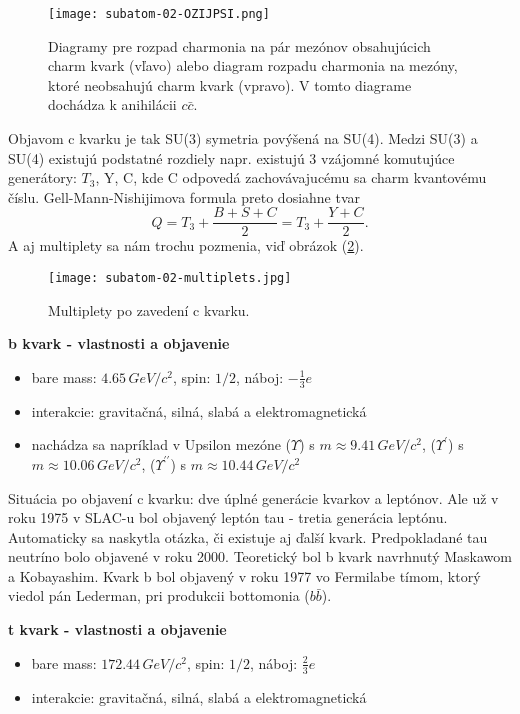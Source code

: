 \documentclass[../../main.tex]{subfiles}
\begin{document}
\begin{figure}[!h]
\texttt{[image: subatom-02-OZIJPSI.png]}
\centering
\caption{Diagramy pre rozpad charmonia na pár mezónov obsahujúcich charm kvark (vľavo) alebo diagram rozpadu charmonia na mezóny, ktoré neobsahujú charm kvark (vpravo). V tomto diagrame dochádza k anihilácii $c \bar{c}$.}
\label{sf2:fig:OZIJPSI}
\end{figure}

Objavom c kvarku je tak SU(3) symetria povýšená na SU(4). Medzi SU(3) a SU(4) existujú podstatné rozdiely napr. existujú 3 vzájomné komutujúce generátory: $T_3$, Y, C, kde C odpovedá zachovávajucému sa charm kvantovému číslu. Gell-Mann-Nishijimova formula preto dosiahne tvar 
$$ Q = T_3 + \frac{B+S+C}{2} = T_3 + \frac{Y+C}{2}.$$
A aj multiplety sa nám trochu pozmenia, viď obrázok (\ref{sf2:fig:multiplets}).

\begin{figure}[!h]
\texttt{[image: subatom-02-multiplets.jpg]}
\centering
\caption{Multiplety po zavedení c kvarku.}
\label{sf2:fig:multiplets}
\end{figure}


\textbf{b kvark - vlastnosti a objavenie}
\begin{itemize}
\item bare mass: $4.65\,\unit{GeV}/c^2$, spin: $1/2$, náboj: $-\frac{1}{3}e$ 
\item interakcie: gravitačná, silná, slabá a elektromagnetická
\item nachádza sa napríklad v Upsilon mezóne ($\Upsilon$) s $m \approx 9.41\,\unit{GeV}/c^2$, ($\Upsilon^{\prime}$) s $m \approx 10.06\,\unit{GeV}/c^2$, ($\Upsilon^{\prime \prime}$) s $m \approx 10.44\,\unit{GeV}/c^2$
\end{itemize}

Situácia po objavení c kvarku: dve úplné generácie kvarkov a leptónov. Ale už v roku 1975 v SLAC-u bol objavený leptón tau - tretia generácia leptónu. Automaticky sa naskytla otázka, či existuje aj ďalší kvark. Predpokladané tau neutríno bolo objavené v roku 2000. Teoretický bol b kvark navrhnutý Maskawom a Kobayashim. Kvark b bol objavený v roku 1977 vo Fermilabe tímom, ktorý viedol pán Lederman, pri produkcii bottomonia ($b \bar{b}$).\newline

\textbf{t kvark - vlastnosti a objavenie}
\begin{itemize}
\item bare mass: $172.44\,\unit{GeV}/c^2$, spin: $1/2$, náboj: $\frac{2}{3}e$ 
\item interakcie: gravitačná, silná, slabá a elektromagnetická
\end{itemize}
\end{document}
